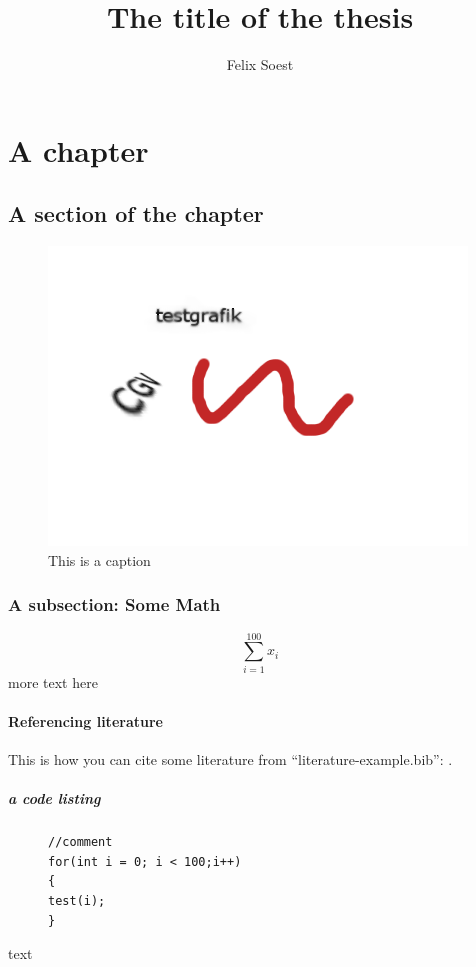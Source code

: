 \documentclass[hyperref, bachelorofscience]{cgvpub}
\author{Felix Soest}
\title{The title of the thesis}
\begin{document}
\chapter{A chapter}
\section{A section of the chapter}
\begin{figure}[htbp]
	\centering
		\includegraphics{test.png}
	\caption{This is a caption}
	\label{fig:label-of-fig}
\end{figure}


\subsection{A subsection: Some Math}

\[
\sum_{i=1}^{100}x_i
\]
more text here
\subsubsection{Referencing literature}
This is how you can cite some literature from "`literature-example.bib"': \cite{kochbuch}.
\paragraph{a code listing}


\begin{figure}[htbp]
\begin{lstlisting}[frame=trbl]
//comment
for(int i = 0; i < 100;i++)
{
test(i);
}
\end{lstlisting}
\end{figure}

text

\cite*{}
\end{document}
